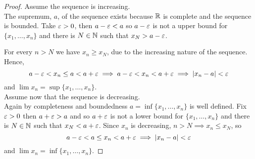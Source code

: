 \documentclass[a4paper,10pt]{article}
\begin{document}
 \begin{proof}
	 Assume the sequence is increasing.\\

	 The supremum, $a$, of the sequence exists because $\mathbb{R}$ is
	 complete and the sequence is bounded. Take $\varepsilon > 0$, then $a
	 - \varepsilon < a$ so $a - \varepsilon$ is not a upper bound for $\{x_1,
	 \ldots, x_n\}$ and there is $N \in \mathbb{N}$ such that $x_N > a - \varepsilon$.

	 For every $n > N$ we have $x_n \geq x_N$, due to the increasing
	 nature of the sequence. Hence,
	 \[
		 a - \varepsilon < x_n \leq a < a + \varepsilon
		 \implies a - \varepsilon < x_n < a + \varepsilon
		 \implies | x_n - a | < \varepsilon
	 \]
	 and $\lim x_n = \sup\{x_1, \ldots, x_n\}$.\\

	 Assume now that the sequence is decreasing.\\

	 Again by completeness and boundedness $a = \inf \{x_1, \ldots,
	 x_n\}$ is well defined.
	 Fix $\varepsilon > 0$ then $a + \varepsilon > a$ and so $a + \varepsilon$ is not a
	 lower bound for $\{x_1, \ldots, x_n\}$ and there is $N \in \mathbb{N}$
	 such that $x_N < a + \varepsilon$.
	 Since $x_n$ is decreasing, $n > N \implies x_n \leq x_N$, so
	 \[
		 a - \varepsilon < a \leq x_n < a + \varepsilon
		 \implies | x_n - a | < \varepsilon
	 \]
	 and $\lim x_n = \inf \{x_1, \ldots, x_n\}$.
 \end{proof}
\end{document}
